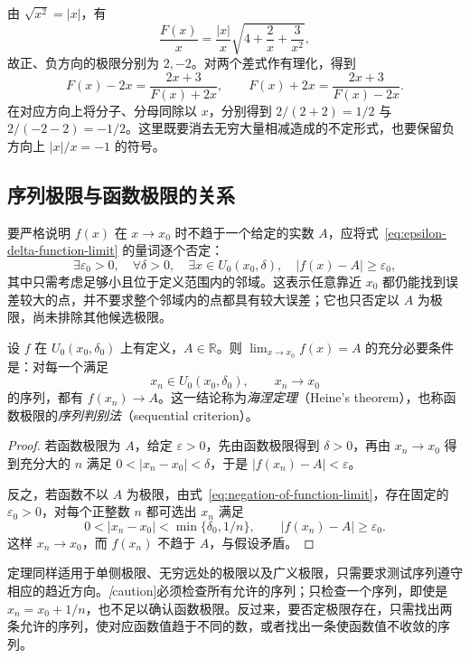 \begin{solve}
由 $\sqrt{x^2}=|x|$，有
\[
    \frac{F(x)}x=\frac{|x|}x\sqrt{4+\frac2x+\frac3{x^2}},
\]
故正、负方向的极限分别为 $2,-2$。对两个差式作有理化，得到
\[
    F(x)-2x=\frac{2x+3}{F(x)+2x},
    \qquad
    F(x)+2x=\frac{2x+3}{F(x)-2x}.
\]
在对应方向上将分子、分母同除以 $x$，分别得到 $2/(2+2)=1/2$ 与 $2/(-2-2)=-1/2$。这里既要消去无穷大量相减造成的不定形式，也要保留负方向上 $|x|/x=-1$ 的符号。
\end{solve}

\subsection{序列极限与函数极限的关系}
\label{subsec:sequence-and-function-limits}

要严格说明 $f(x)$ 在 $x\to x_0$ 时不趋于一个给定的实数 $A$，应将式~\eqref{eq:epsilon-delta-function-limit} 的量词逐个否定：
\begin{equation}
    \exists\varepsilon_0>0,\quad\forall\delta>0,\quad
    \exists x\in U_0(x_0,\delta),\quad |f(x)-A|\geq\varepsilon_0,
    \label{eq:negation-of-function-limit}
\end{equation}
其中只需考虑足够小且位于定义范围内的邻域。这表示任意靠近 $x_0$ 都仍能找到误差较大的点，并不要求整个邻域内的点都具有较大误差；它也只否定以 $A$ 为极限，尚未排除其他候选极限。

\begin{theorem}[海涅定理]
\label{thm:heine-sequential-criterion}
设 $f$ 在 $U_0(x_0,\delta_0)$ 上有定义，$A\in\mathbb{R}$。则 $\lim_{x\to x_0}f(x)=A$ 的充分必要条件是：对每一个满足
\[
    x_n\in U_0(x_0,\delta_0),\qquad x_n\to x_0
\]
的序列，都有 $f(x_n)\to A$。这一结论称为\emph{海涅定理}（Heine's theorem），也称函数极限的\emph{序列判别法}（sequential criterion）。
\end{theorem}

\begin{proof}
若函数极限为 $A$，给定 $\varepsilon>0$，先由函数极限得到 $\delta>0$，再由 $x_n\to x_0$ 得到充分大的 $n$ 满足 $0<|x_n-x_0|<\delta$，于是 $|f(x_n)-A|<\varepsilon$。

反之，若函数不以 $A$ 为极限，由式~\eqref{eq:negation-of-function-limit}，存在固定的 $\varepsilon_0>0$，对每个正整数 $n$ 都可选出 $x_n$ 满足
\[
    0<|x_n-x_0|<\min\{\delta_0,1/n\},
    \qquad |f(x_n)-A|\geq\varepsilon_0.
\]
这样 $x_n\to x_0$，而 $f(x_n)$ 不趋于 $A$，与假设矛盾。
\end{proof}

定理同样适用于单侧极限、无穷远处的极限以及广义极限，只需要求测试序列遵守相应的趋近方向。\emph[caution]{必须检查所有允许的序列；只检查一个序列，即使是 $x_n=x_0+1/n$，也不足以确认函数极限。}反过来，要否定极限存在，只需找出两条允许的序列，使对应函数值趋于不同的数，或者找出一条使函数值不收敛的序列。

